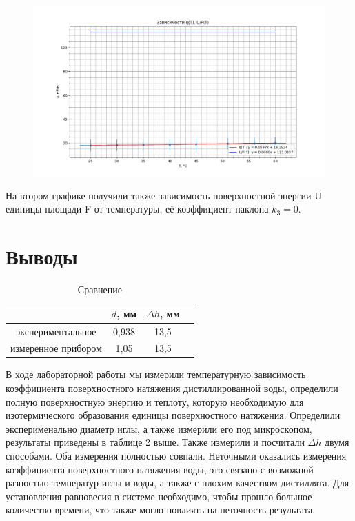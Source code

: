 \documentclass[a4paper,12pt]{article}
\begin{document}
                \begin{figure}[!ht]
                    \begin{center}
                        \includegraphics[width=1 \textwidth]{251-2gr.png}
                    \end{center}
                \end{figure}

                На втором графике получили также зависимость поверхностной энергии U единицы площади F от температуры, её коэффициент наклона $k_3 = 0$.
                \section{Выводы}
                \begin{table}[H]
                \centering
                \caption{Сравнение}
                \begin{tabular}{|c|c|c|c|}
                    \hline
                              & $d$, мм & $\Delta h$, мм  \\
                    \hline
                    экспериментальное & 0,938 & 13,5   \\
                    \hline
                    измеренное прибором & 1,05 & 13,5  \\
                    \hline
                \end{tabular}
                \end{table}

            В ходе лабораторной работы мы измерили температурную зависимость коэффициента поверхностного
            натяжения дистиллированной воды, определили полную поверхностную энергию и теплоту, которую необходимую для изотермического образования единицы поверхностного натяжения. 
                Определили эксперименально диаметр иглы, а также измерили его под микроскопом, результаты приведены в таблице 2 выше. 
            Также измерили и посчитали $\Delta h$ двумя способами. Оба измерения полностью совпали. Неточными оказались измерения коэффициента поверхностного натяжения воды, это связано с возможной разностью температур иглы и воды, а также с плохим качеством дистиллята. Для установления равновесия в системе необходимо, чтобы прошло большое количество времени, что также могло повлиять на неточность результата.
    
\end{document}
